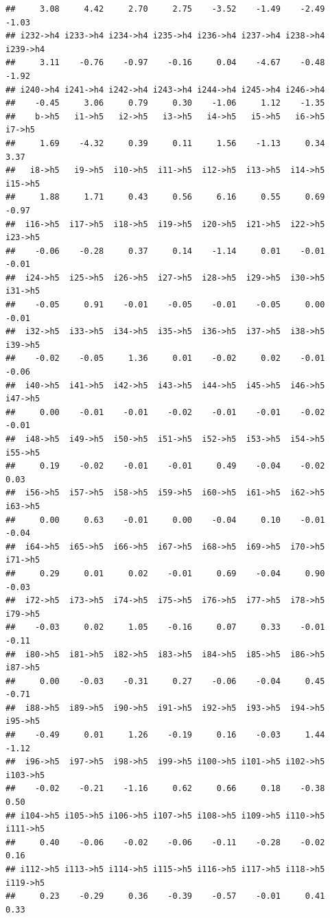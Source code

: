 \documentclass[
]{article}
\begin{document}
\begin{verbatim}
##     3.08     4.42     2.70     2.75    -3.52    -1.49    -2.49    -1.03 
## i232->h4 i233->h4 i234->h4 i235->h4 i236->h4 i237->h4 i238->h4 i239->h4 
##     3.11    -0.76    -0.97    -0.16     0.04    -4.67    -0.48    -1.92 
## i240->h4 i241->h4 i242->h4 i243->h4 i244->h4 i245->h4 i246->h4 
##    -0.45     3.06     0.79     0.30    -1.06     1.12    -1.35 
##    b->h5   i1->h5   i2->h5   i3->h5   i4->h5   i5->h5   i6->h5   i7->h5 
##     1.69    -4.32     0.39     0.11     1.56    -1.13     0.34     3.37 
##   i8->h5   i9->h5  i10->h5  i11->h5  i12->h5  i13->h5  i14->h5  i15->h5 
##     1.88     1.71     0.43     0.56     6.16     0.55     0.69    -0.97 
##  i16->h5  i17->h5  i18->h5  i19->h5  i20->h5  i21->h5  i22->h5  i23->h5 
##    -0.06    -0.28     0.37     0.14    -1.14     0.01    -0.01    -0.01 
##  i24->h5  i25->h5  i26->h5  i27->h5  i28->h5  i29->h5  i30->h5  i31->h5 
##    -0.05     0.91    -0.01    -0.05    -0.01    -0.05     0.00    -0.01 
##  i32->h5  i33->h5  i34->h5  i35->h5  i36->h5  i37->h5  i38->h5  i39->h5 
##    -0.02    -0.05     1.36     0.01    -0.02     0.02    -0.01    -0.06 
##  i40->h5  i41->h5  i42->h5  i43->h5  i44->h5  i45->h5  i46->h5  i47->h5 
##     0.00    -0.01    -0.01    -0.02    -0.01    -0.01    -0.02    -0.01 
##  i48->h5  i49->h5  i50->h5  i51->h5  i52->h5  i53->h5  i54->h5  i55->h5 
##     0.19    -0.02    -0.01    -0.01     0.49    -0.04    -0.02     0.03 
##  i56->h5  i57->h5  i58->h5  i59->h5  i60->h5  i61->h5  i62->h5  i63->h5 
##     0.00     0.63    -0.01     0.00    -0.04     0.10    -0.01    -0.04 
##  i64->h5  i65->h5  i66->h5  i67->h5  i68->h5  i69->h5  i70->h5  i71->h5 
##     0.29     0.01     0.02    -0.01     0.69    -0.04     0.90    -0.03 
##  i72->h5  i73->h5  i74->h5  i75->h5  i76->h5  i77->h5  i78->h5  i79->h5 
##    -0.03     0.02     1.05    -0.16     0.07     0.33    -0.01    -0.11 
##  i80->h5  i81->h5  i82->h5  i83->h5  i84->h5  i85->h5  i86->h5  i87->h5 
##     0.00    -0.03    -0.31     0.27    -0.06    -0.04     0.45    -0.71 
##  i88->h5  i89->h5  i90->h5  i91->h5  i92->h5  i93->h5  i94->h5  i95->h5 
##    -0.49     0.01     1.26    -0.19     0.16    -0.03     1.44    -1.12 
##  i96->h5  i97->h5  i98->h5  i99->h5 i100->h5 i101->h5 i102->h5 i103->h5 
##    -0.02    -0.21    -1.16     0.62     0.66     0.18    -0.38     0.50 
## i104->h5 i105->h5 i106->h5 i107->h5 i108->h5 i109->h5 i110->h5 i111->h5 
##     0.40    -0.06    -0.02    -0.06    -0.11    -0.28    -0.02     0.16 
## i112->h5 i113->h5 i114->h5 i115->h5 i116->h5 i117->h5 i118->h5 i119->h5 
##     0.23    -0.29     0.36    -0.39    -0.57    -0.01     0.41     0.33 

\end{verbatim}
\end{document}
